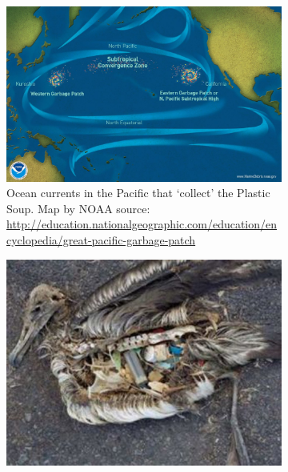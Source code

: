 \begin{figure}%
  \centering
   \begin{minipage}{\widefigwidth}
 	\begin{center}
     \begin{subfigure}[t]{.65\textwidth}
      \ifx\showfig\undefined
       \includegraphics[keepaspectratio=true,width=\textwidth]{images/garbage-patch.jpg} \fi
      \caption{Ocean currents in the Pacific that `collect' the Plastic Soup. Map by NOAA source: \url{http://education.nationalgeographic.com/education/encyclopedia/great-pacific-garbage-patch}}
      \label{fig:plastic-where}
     \end{subfigure}
    \end{center}
   \begin{subfigure}[t]{.48\textwidth}
    \ifx\showfig\undefined
	 \includegraphics[keepaspectratio=true,width=\textwidth]{images/Bird_with_plastic_stomach.jpg} \fi

\end{subfigure}
\end{minipage}
\end{figure}
